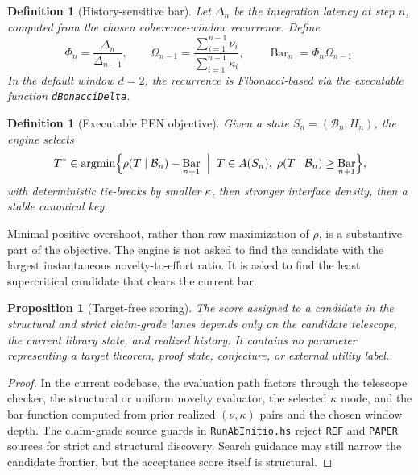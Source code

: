 \documentclass[pdflatex,sn-mathphys,Numbered]{sn-jnl}
\theoremstyle{thmstyleone}
\newtheorem{proposition}[theorem]{Proposition}
\theoremstyle{thmstylethree}
\newtheorem{definition}[theorem]{Definition}
\theoremstyle{thmstyletwo}
\newcommand{\Bcal}{\mathcal{B}}
\DeclareMathOperator{\BarOp}{Bar}
\DeclareMathOperator{\argminp}{argmin}
\begin{document}
\begin{definition}[History-sensitive bar]
Let $\Delta_n$ be the integration latency at step $n$, computed from the chosen coherence-window recurrence. Define
\[
  \Phi_n=\frac{\Delta_n}{\Delta_{n-1}},
  \qquad
  \Omega_{n-1}=\frac{\sum_{i=1}^{n-1}\nu_i}{\sum_{i=1}^{n-1}\kappa_i},
  \qquad
  \BarOp_n=\Phi_n\Omega_{n-1}.
\]
In the default window $d=2$, the recurrence is Fibonacci-based via the executable function \texttt{dBonacciDelta}.
\end{definition}

\begin{definition}[Executable PEN objective]
Given a state $S_n=(\Bcal_n,H_n)$, the engine selects
\[
  T^* \in \argminp\Bigl\{\rho(T\mid\Bcal_n)-\BarOp_{n+1}
  \;\Bigm|\; T\in A(S_n),\; \rho(T\mid\Bcal_n)\geq \BarOp_{n+1}\Bigr\},
\]
with deterministic tie-breaks by smaller $\kappa$, then stronger interface density, then a stable canonical key.
\end{definition}

Minimal positive overshoot, rather than raw maximization of $\rho$, is a substantive part of the objective. The engine is not asked to find the candidate with the largest instantaneous novelty-to-effort ratio. It is asked to find the least supercritical candidate that clears the current bar.

\begin{proposition}[Target-free scoring]
\label{prop:targetfree}
The score assigned to a candidate in the structural and strict claim-grade lanes depends only on the candidate telescope, the current library state, and realized history. It contains no parameter representing a target theorem, proof state, conjecture, or external utility label.
\end{proposition}

\begin{proof}
In the current codebase, the evaluation path factors through the telescope checker, the structural or uniform novelty evaluator, the selected $\kappa$ mode, and the bar function computed from prior realized $(\nu,\kappa)$ pairs and the chosen window depth. The claim-grade source guards in \texttt{RunAbInitio.hs} reject \texttt{REF} and \texttt{PAPER} sources for strict and structural discovery. Search guidance may still narrow the candidate frontier, but the acceptance score itself is structural.
\end{proof}
\end{document}
